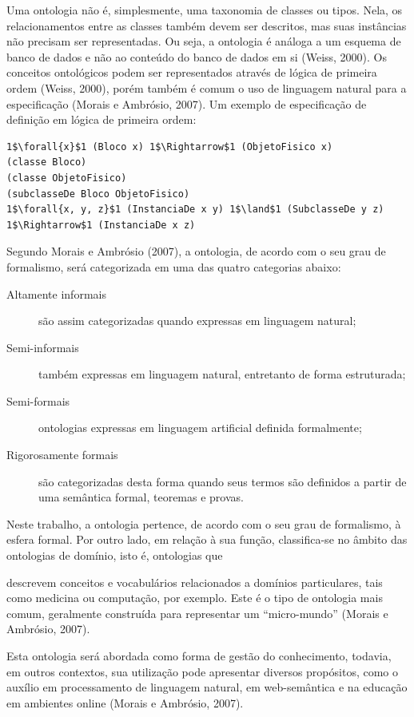 Uma ontologia não é, simplesmente, uma taxonomia de classes ou tipos. Nela, os relacionamentos entre as classes também devem ser descritos, mas suas instâncias não precisam ser representadas.  Ou seja, a ontologia é análoga a um esquema de banco de dados e não ao conteúdo do banco de dados em si (Weiss, 2000). Os conceitos ontológicos podem ser representados através de lógica de primeira ordem (Weiss, 2000), porém também é comum o uso de linguagem natural para a especificação (Morais e Ambrósio, 2007). Um exemplo de especificação de definição em lógica de primeira ordem:


\vspace{0.4cm}
\begin{lstlisting}[frame=single]
1$\forall{x}$1 (Bloco x) 1$\Rightarrow$1 (ObjetoFisico x)
(classe Bloco)
(classe ObjetoFisico)
(subclasseDe Bloco ObjetoFisico)
1$\forall{x, y, z}$1 (InstanciaDe x y) 1$\land$1 (SubclasseDe y z) 1$\Rightarrow$1 (InstanciaDe x z)
\end{lstlisting}

Segundo Morais e Ambrósio (2007),  a ontologia,  de acordo com o seu grau de formalismo, será categorizada em uma das quatro categorias abaixo:
\begin{description}
    \item [Altamente informais] são assim categorizadas quando expressas em linguagem natural;
    \item [Semi-informais] também expressas em linguagem natural, entretanto de forma estruturada;
    \item [Semi-formais] ontologias expressas em linguagem artificial definida formalmente;
    \item [Rigorosamente formais] são categorizadas desta forma quando seus termos são definidos a partir de uma semântica formal, teoremas e provas.
\end{description}

Neste trabalho, a ontologia pertence, de acordo com o seu grau de formalismo, à esfera formal. Por outro lado, em relação à sua função, classifica-se no âmbito das ontologias de domínio, isto é, ontologias que 
\begin{directcite}
    descrevem conceitos e vocabulários relacionados a domínios particulares, tais como medicina ou computação, por exemplo.  Este é o tipo de ontologia mais comum, geralmente construída para representar um “micro-mundo” (Morais e Ambrósio, 2007).
\end{directcite}Esta ontologia será abordada como forma de gestão do conhecimento, todavia, em outros contextos,  sua utilização pode apresentar diversos propósitos,  como o auxílio em processamento de linguagem natural, em web-semântica e na educação em ambientes online (Morais e Ambrósio, 2007).

